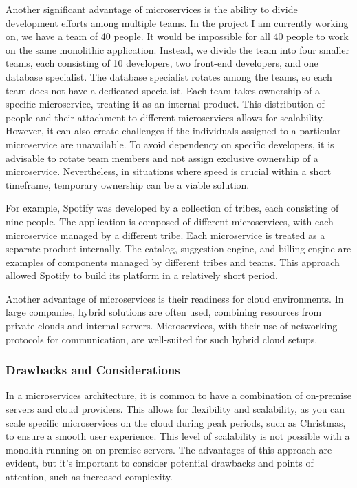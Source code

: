 Another significant advantage of microservices is the ability to divide
development efforts among multiple teams. In the project I am currently
working on, we have a team of 40 people. It would be impossible for all
40 people to work on the same monolithic application. Instead, we divide
the team into four smaller teams, each consisting of 10 developers, two
front-end developers, and one database specialist. The database
specialist rotates among the teams, so each team does not have a
dedicated specialist. Each team takes ownership of a specific
microservice, treating it as an internal product. This distribution of
people and their attachment to different microservices allows for
scalability. However, it can also create challenges if the individuals
assigned to a particular microservice are unavailable. To avoid
dependency on specific developers, it is advisable to rotate team
members and not assign exclusive ownership of a microservice.
Nevertheless, in situations where speed is crucial within a short
timeframe, temporary ownership can be a viable solution.

For example, Spotify was developed by a collection of tribes, each
consisting of nine people. The application is composed of different
microservices, with each microservice managed by a different tribe. Each
microservice is treated as a separate product internally. The catalog,
suggestion engine, and billing engine are examples of components managed
by different tribes and teams. This approach allowed Spotify to build
its platform in a relatively short period.

Another advantage of microservices is their readiness for cloud
environments. In large companies, hybrid solutions are often used,
combining resources from private clouds and internal servers.
Microservices, with their use of networking protocols for communication,
are well-suited for such hybrid cloud setups.

\subsubsection{Drawbacks and Considerations}

In a microservices architecture, it is common to have a combination of
on-premise servers and cloud providers. This allows for flexibility and
scalability, as you can scale specific microservices on the cloud during
peak periods, such as Christmas, to ensure a smooth user experience.
This level of scalability is not possible with a monolith running on
on-premise servers. The advantages of this approach are evident, but
it's important to consider potential drawbacks and points of attention,
such as increased complexity.

